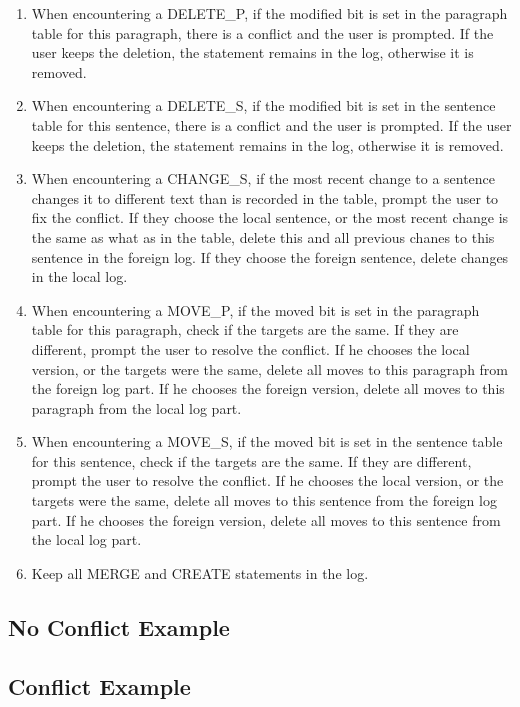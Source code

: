 \begin{enumerate}[1)]

\item When encountering a DELETE\_P, if the modified bit is set in the paragraph table for this paragraph,
      there is a conflict and the user is prompted. If the user keeps the deletion, the
      statement remains in the log, otherwise it is removed.

\item When encountering a DELETE\_S, if the modified bit is set in the sentence table for this sentence,
      there is a conflict and the user is prompted. If the user keeps the deletion, the
      statement remains in the log, otherwise it is removed.

\item When encountering a CHANGE\_S, if the most recent change to a sentence changes it to different text
      than is recorded in the table, prompt the user to fix the conflict. If they choose the local sentence,
      or the most recent change is the same as what as in the table, delete this and all previous chanes
      to this sentence in the foreign log. If they choose the foreign sentence, delete changes in the 
      local log.

\item When encountering a MOVE\_P, if the moved bit is set in the paragraph table for this paragraph,
      check if the targets are the same. If they are different, prompt the
      user to resolve the conflict. If he chooses the local version, or the targets were the same, 
      delete all moves to this paragraph
      from the foreign log part. If he chooses the foreign version, delete all moves to this paragraph
      from the local log part.

\item When encountering a MOVE\_S, if the moved bit is set in the sentence table for this sentence,
      check if the targets are the same. If they are different, prompt the
      user to resolve the conflict. If he chooses the local version, or the targets were the same, 
      delete all moves to this sentence 
      from the foreign log part. If he chooses the foreign version, delete all moves to this sentence 
      from the local log part.

\item Keep all MERGE and CREATE statements in the log.
\end{enumerate}

\subsection{No Conflict Example}


\subsection{Conflict Example}









